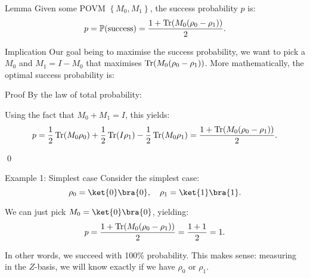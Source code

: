 \documentclass[a4paper]{article}
\begin{document}
\begin{parag}{Lemma}
    Given some POVM $\left\{M_0, M_1\right\}$, the success probability $p$ is:
    \[p = \prob\left(\text{success}\right) = \frac{1 + \Tr\left(M_0 \left(\rho_0 - \rho_1\right)\right)}{2}.\]

    \begin{subparag}{Implication}
        Our goal being to maximise the success probability, we want to pick a $M_0$ and $M_1 = I - M_0$ that maximises $\Tr\left(M_0 \left(\rho_0 - \rho_1\right)\right)$. More mathematically, the optimal success probability is:
    \end{subparag}

    \begin{subparag}{Proof}
        By the law of total probability:

        Using the fact that $M_0 + M_1 = I$, this yields: 
        \[p = \frac{1}{2} \Tr\left(M_0 \rho_0\right) + \frac{1}{2} \Tr\left(I \rho_1\right) - \frac{1}{2} \Tr\left(M_0 \rho_1\right) = \frac{1 + \Tr\left(M_0 \left(\rho_0 - \rho_1\right)\right)}{2}.\]
        
        \qed
    \end{subparag}
\end{parag}

\begin{parag}{Example 1: Simplest case}
    Consider the simplest case: 
    \[\rho_0 = \ket{0}\bra{0}, \mathspace \rho_1 = \ket{1}\bra{1}.\]
    
    We can just pick $M_0 = \ket{0}\bra{0}$, yielding: 
    \[p = \frac{1 + \Tr\left(M_0 \left(\rho_0 - \rho_1\right)\right)}{2} = \frac{1 + 1}{2} = 1.\]
    
    In other words, we succeed with 100\% probability. This makes sense: measuring in the $Z$-basis, we will know exactly if we have $\rho_0$ or $\rho_1$. 
\end{parag}
\end{document}
